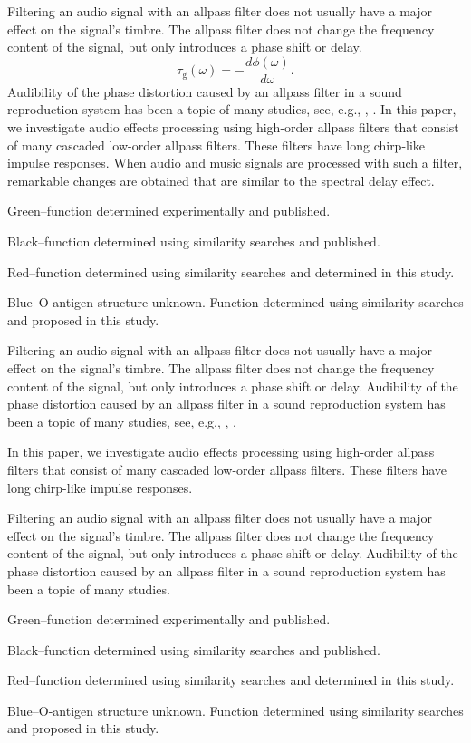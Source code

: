 \documentclass{aes2e}
\begin{document}
Filtering an audio signal with an allpass filter does not usually have a major effect on the signal's timbre. The allpass filter does not change the frequency content of the signal, but only introduces a phase shift or delay. 
\[
\tau _\textrm{g} (\omega ) =  - \frac{{d\phi (\omega )}}{{d\omega }}.
\]
Audibility of the phase distortion caused by an allpass filter in a sound reproduction system has been a topic of many studies, see, e.g., \cite{DEK1}, \cite{DEK2}. In this paper, we investigate audio effects processing using high-order allpass filters that consist of many cascaded low-order allpass filters. These filters have long chirp-like impulse responses. When audio and music signals are processed with such a filter, remarkable changes are obtained that are similar to the spectral delay effect.
\begin{alphalist}
\item{}Green--function determined experimentally and published.
\item{}Black--function determined using similarity searches and published.
\item{}Red--function determined using similarity searches and determined in this study.
\item{}Blue--O-antigen structure unknown. Function determined using similarity searches and proposed in this study.
\end{alphalist}
Filtering an audio signal with an allpass filter does not usually have a major effect on the signal's timbre. The allpass filter does not change the frequency content of the signal, but only introduces a phase shift or delay. Audibility of the phase distortion caused by an allpass filter in a sound reproduction system has been a topic of many studies, see, e.g., \cite{DEK1}, \cite{DEK2}. 
\begin{example}
In this paper, we investigate audio effects processing using high-order allpass filters that consist of many cascaded low-order allpass filters. These filters have long chirp-like impulse responses. 
\end{example}
Filtering an audio signal with an allpass filter does not usually have a major effect on the signal's timbre. The allpass filter does not change the frequency content of the signal, but only introduces a phase shift or delay. Audibility of the phase distortion caused by an allpass filter in a sound reproduction system has been a topic of many studies.
\begin{bulletlist}
\item{}Green--function determined experimentally and published.
\item{}Black--function determined using similarity searches and published.
\item{}Red--function determined using similarity searches and determined in this study.
\item{}Blue--O-antigen structure unknown. Function determined using similarity searches and proposed in this study.
\end{bulletlist}
\end{document}
